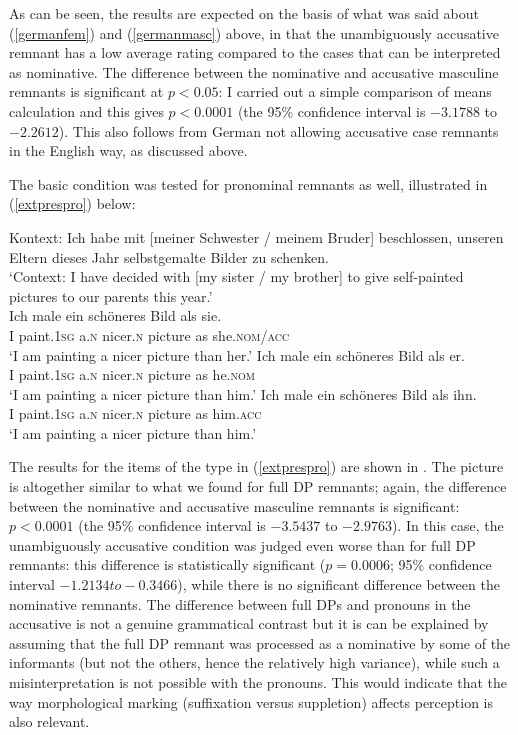 As can be seen, the results are expected on the basis of what was said about (\ref{germanfem}) and (\ref{germanmasc}) above, in that the unambiguously accusative remnant has a low average rating compared to the cases that can be interpreted as nominative. The difference between the nominative and accusative masculine remnants is significant at $p<0.05$: I carried out a simple comparison of means calculation and this gives $p<0.0001$ (the 95\% confidence interval is $-3.1788$ to $-2.2612$). This also follows from German not allowing accusative case remnants in the English way, as discussed above.

The basic condition was tested for pronominal remnants as well, illustrated in (\ref{extprespro}) below:\pagebreak

\ea Kontext: Ich habe mit [meiner Schwester / meinem Bruder] beschlossen, unseren Eltern dieses Jahr selbstgemalte Bilder zu schenken. \label{extprespro}\\
`Context: I have decided with [my sister / my brother] to give self-painted pictures to our parents this year.'\\
\ea \gll Ich male ein schöneres Bild als sie. \label{extpresproambig}\\
I paint.\textsc{1sg} a.\textsc{n} nicer.\textsc{n} picture as she.\textsc{nom/acc}\\
\glt `I am painting a nicer picture than her.'
\ex \gll Ich male ein schöneres Bild als er. \label{extprespronom}\\
I paint.\textsc{1sg} a.\textsc{n} nicer.\textsc{n} picture as he.\textsc{nom}\\
\glt `I am painting a nicer picture than him.'
\ex \gll Ich male ein schöneres Bild als ihn. \label{extpresproacc}\\
I paint.\textsc{1sg} a.\textsc{n} nicer.\textsc{n} picture as him.\textsc{acc}\\
\glt `I am painting a nicer picture than him.'
\z
\z

The results for the items of the type in (\ref{extprespro}) are shown in .
The picture is altogether similar to what we found for full DP remnants; again, the difference between the nominative and accusative masculine remnants is significant: $p<0.0001$ (the 95\% confidence interval is $-3.5437$ to $-2.9763$). In this case, the unambiguously accusative condition was judged even worse than for full DP remnants: this difference is statistically significant ($p=0.0006$; 95\% confidence interval $-1.2134 to -0.3466$), while there is no significant difference between the nominative remnants. The difference between full DPs and pronouns in the accusative is not a genuine grammatical contrast but it is can be explained by assuming that the full DP remnant was processed as a nominative by some of the informants (but not the others, hence the relatively high variance), while such a misinterpretation is not possible with the pronouns. This would indicate that the way morphological marking (suffixation versus suppletion) affects perception is also relevant.


